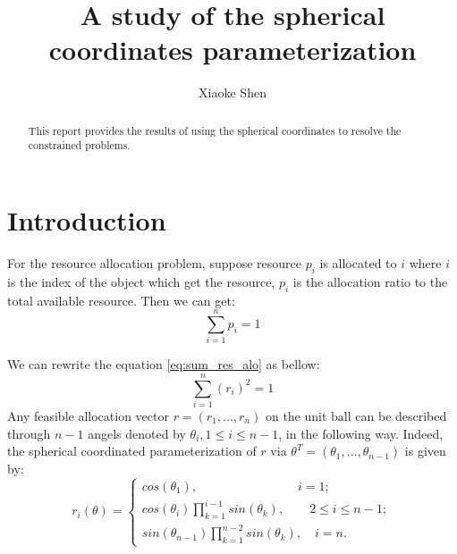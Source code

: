 \documentclass[a4paper,12pt]{article}
\title {A study of the spherical coordinates parameterization}
\author{Xiaoke Shen}
\affil{the Graduate Center, the City University of New York}
\date{}
\begin{document}
\maketitle

\begin{abstract}
This report provides the results of using the spherical coordinates to resolve the constrained problems.
\end{abstract}
\section{Introduction}
For the resource allocation problem, suppose resource $p_i$ is allocated to $i$ where $i$ is the index of the object which get the resource, $p_i$ is the allocation ratio to the total available resource. Then we can get:\\
\begin{equation} \label{eq:sum_res_alo}
\sum_{i=1}^{n} p_i = 1
\end{equation}

We can rewrite the equation \ref{eq:sum_res_alo} as bellow:\\
\begin{equation} \label{eq:sum_res_alo_r_2}
\sum_{i=1}^{n} (r_i)^2 = 1
\end{equation}
Any feasible allocation vector $r = (r_1,...,r_n)$ on the unit ball can be described through $n-1$ angels denoted by $\theta_i, 1\leq i \leq n-1$, in the following way. Indeed, the spherical coordinated parameterization of $r$ via $\theta^T = (\theta_1,...,\theta_{n-1}) $ is given by:\\



\begin{equation}\label{eq:sphe}
    r_i(\theta)=\left\{
                \begin{array}{ll}
                  cos(\theta_1), \quad \quad \quad \quad \quad \quad \quad \quad i=1;\\
                  cos(\theta_i)\prod_{k=1}^{i-1} sin(\theta_k),\quad  \quad  2\leq i \leq n-1;\\
                  sin(\theta_{n-1})\prod_{k=1}^{n-2} sin(\theta_k),\quad  i=n.
                \end{array}
              \right.
\end{equation}
\end{document}
